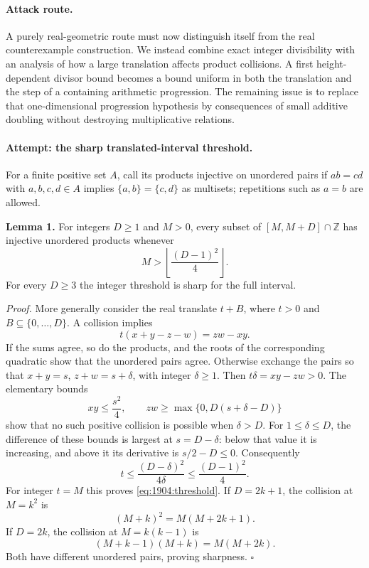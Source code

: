 \documentclass[11pt,a4paper]{article}
\newcommand{\Z}{\mathbb{Z}}
\numberwithin{equation}{section}
\begin{document}
\paragraph{Attack route.}
A purely real-geometric route must now distinguish itself from the real
counterexample construction. We instead combine exact integer divisibility
with an analysis of how a large translation affects product collisions.
A first height-dependent divisor bound becomes a bound uniform in both
the translation and the step of a containing arithmetic progression.
The remaining issue is to replace that one-dimensional progression
hypothesis by consequences of small additive doubling without destroying
multiplicative relations.

\paragraph{Attempt: the sharp translated-interval threshold.}
For a finite positive set $A$, call its products injective on unordered
pairs if $ab=cd$ with $a,b,c,d\in A$ implies $\{a,b\}=\{c,d\}$ as
multisets; repetitions such as $a=b$ are allowed.

\textbf{Lemma 1.} For integers $D\geq1$ and $M>0$, every subset of
$[M,M+D]\cap\Z$ has injective unordered products whenever
\begin{equation}\label{eq:1904:threshold}
 M>\left\lfloor\frac{(D-1)^2}{4}\right\rfloor.
\end{equation}
For every $D\geq3$ the integer threshold is sharp for the full interval.

\emph{Proof.} More generally consider the real translate
$t+B$, where $t>0$ and $B\subseteq\{0,\ldots,D\}$. A collision implies
\[
 t(x+y-z-w)=zw-xy.
\]
If the sums agree, so do the products, and the roots of the corresponding
quadratic show that the unordered pairs agree. Otherwise exchange the
pairs so that $x+y=s$, $z+w=s+\delta$, with integer $\delta\geq1$.
Then $t\delta=xy-zw>0$. The elementary bounds
\[
 xy\leq\frac{s^2}{4},\qquad
 zw\geq\max\{0,D(s+\delta-D)\}
\]
show that no such positive collision is possible when $\delta>D$.
For $1\leq\delta\leq D$, the difference of these bounds is largest at
$s=D-\delta$: below that value it is increasing, and above it its
derivative is $s/2-D\leq0$. Consequently
\[
 t\leq\frac{(D-\delta)^2}{4\delta}
 \leq\frac{(D-1)^2}{4}.
\]
For integer $t=M$ this proves \eqref{eq:1904:threshold}.
If $D=2k+1$, the collision at $M=k^2$ is
\[
 (M+k)^2=M(M+2k+1).
\]
If $D=2k$, the collision at $M=k(k-1)$ is
\[
 (M+k-1)(M+k)=M(M+2k).
\]
Both have different unordered pairs, proving sharpness. $\square$
\end{document}
